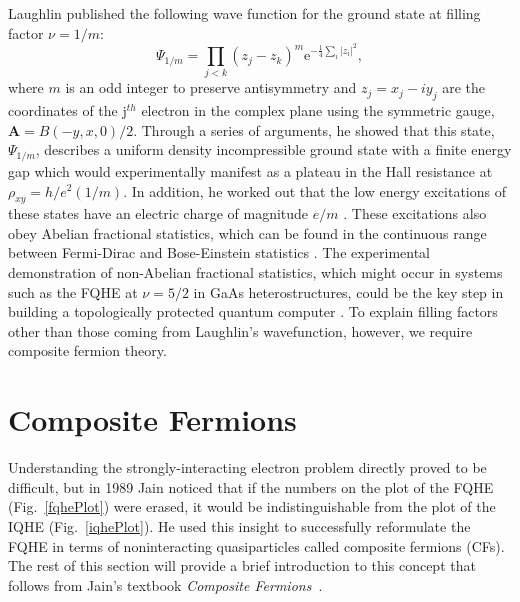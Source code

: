             Laughlin published the following wave function for the ground state at filling factor $\nu=1/m$:
            \begin{equation}\label{eqn:one_over_m_wavefnx}
            \Psi_{1 / m}=\prod_{j<k}\left(z_{j}-z_{k}\right)^{m} \mathrm{e}^{-\frac{1}{4} \sum_{i}\left|z_{i}\right|^{2}},
            \end{equation}
            where $m$ is an odd integer to preserve antisymmetry and $z_j=x_j-iy_j$ are the coordinates of the j$^{th}$ electron in the complex plane using the symmetric gauge, $\mathbf{A} = B(-y,x,0)/2$. Through a series of arguments, he showed that this state, $\Psi_{1/m}$, describes a uniform density incompressible ground state with a finite energy gap which would experimentally manifest as a plateau in the Hall resistance at $\rho_{xy} = h/e^2(1/m)$. In addition, he worked out that the low energy excitations of these states have an electric charge of magnitude $e/m$ \cite{jain}.
            These excitations also obey Abelian fractional statistics, which can be found in the continuous range  between Fermi-Dirac and Bose-Einstein statistics \cite{laughlin}. The experimental demonstration of non-Abelian fractional statistics, which might occur in systems such as the FQHE at $\nu=5/2$ in GaAs heterostructures, could be the key step in building a topologically protected quantum computer \cite{nayak}. To explain filling factors other than those coming from Laughlin's wavefunction, however, we require composite fermion theory.
    		
\section{Composite Fermions}\label{sec:compFerm}

	Understanding the strongly-interacting electron problem directly proved to be difficult, but in 1989 Jain noticed that if the numbers on the plot of the FQHE (Fig.~\ref{fqhePlot}) were erased, it would be indistinguishable from the plot of the IQHE (Fig.~\ref{iqhePlot}). He used this insight to successfully  reformulate the FQHE in terms of noninteracting quasiparticles called composite fermions (CFs). The rest of this section will provide a brief introduction to this concept that follows from Jain's textbook \textit{Composite Fermions}~\cite{jain}.
	
